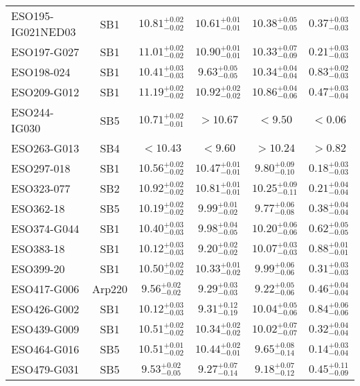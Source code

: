 \documentclass[onecolumn]{mn2e}
\begin{document}
{\begin{center}
\begin{longtable}{lccccc}
ESO195-IG021NED03 & SB1 & $10.81_{-0.02}^{+0.02}$ & $10.61_{-0.01}^{+0.01}$ & $10.38_{-0.05}^{+0.05}$ &$0.37_{-0.03}^{+0.03}$ \\
ESO197-G027 & SB1 & $11.01_{-0.02}^{+0.02}$ & $10.90_{-0.01}^{+0.01}$ & $10.33_{-0.09}^{+0.07}$ &$0.21_{-0.03}^{+0.03}$ \\
ESO198-024 & SB1 & $10.41_{-0.03}^{+0.03}$ & $9.63_{-0.05}^{+0.05}$ & $10.34_{-0.04}^{+0.04}$ &$0.83_{-0.03}^{+0.02}$ \\
ESO209-G012 & SB1 & $11.19_{-0.02}^{+0.02}$ & $10.92_{-0.02}^{+0.02}$ & $10.86_{-0.06}^{+0.04}$ &$0.47_{-0.04}^{+0.03}$ \\
ESO244-IG030 & SB5 & $10.71_{-0.01}^{+0.02}$ & $>10.67$ & $<9.50$ &$<0.06$ \\
ESO263-G013 & SB4 & $<10.43$ & $<9.60$ & $>10.24$ &$>0.82$ \\
ESO297-018 & SB1 & $10.56_{-0.02}^{+0.02}$ & $10.47_{-0.01}^{+0.01}$ & $9.80_{-0.10}^{+0.09}$ &$0.18_{-0.03}^{+0.03}$ \\
ESO323-077 & SB2 & $10.92_{-0.02}^{+0.02}$ & $10.81_{-0.01}^{+0.01}$ & $10.25_{-0.11}^{+0.09}$ &$0.21_{-0.04}^{+0.04}$ \\
ESO362-18 & SB5 & $10.19_{-0.02}^{+0.02}$ & $9.99_{-0.02}^{+0.01}$ & $9.77_{-0.08}^{+0.06}$ &$0.38_{-0.04}^{+0.04}$ \\
ESO374-G044 & SB1 & $10.40_{-0.03}^{+0.03}$ & $9.98_{-0.05}^{+0.04}$ & $10.20_{-0.06}^{+0.06}$ &$0.62_{-0.05}^{+0.05}$ \\
ESO383-18 & SB1 & $10.12_{-0.03}^{+0.03}$ & $9.20_{-0.02}^{+0.02}$ & $10.07_{-0.03}^{+0.03}$ &$0.88_{-0.01}^{+0.01}$ \\
ESO399-20 & SB1 & $10.50_{-0.02}^{+0.02}$ & $10.33_{-0.02}^{+0.01}$ & $9.99_{-0.06}^{+0.06}$ &$0.31_{-0.03}^{+0.03}$ \\
ESO417-G006 & Arp220 & $9.56_{-0.02}^{+0.02}$ & $9.29_{-0.03}^{+0.03}$ & $9.22_{-0.06}^{+0.05}$ &$0.46_{-0.04}^{+0.04}$ \\
ESO426-G002 & SB1 & $10.12_{-0.03}^{+0.03}$ & $9.31_{-0.19}^{+0.12}$ & $10.04_{-0.06}^{+0.05}$ &$0.84_{-0.06}^{+0.06}$ \\
ESO439-G009 & SB1 & $10.51_{-0.02}^{+0.02}$ & $10.34_{-0.02}^{+0.02}$ & $10.02_{-0.07}^{+0.07}$ &$0.32_{-0.04}^{+0.04}$ \\
ESO464-G016 & SB5 & $10.51_{-0.02}^{+0.01}$ & $10.44_{-0.01}^{+0.02}$ & $9.65_{-0.14}^{+0.08}$ &$0.14_{-0.04}^{+0.03}$ \\
ESO479-G031 & SB5 & $9.53_{-0.05}^{+0.02}$ & $9.27_{-0.14}^{+0.07}$ & $9.18_{-0.12}^{+0.07}$ &$0.45_{-0.09}^{+0.11}$ \\

\end{longtable}
\end{center}}
\end{document}
